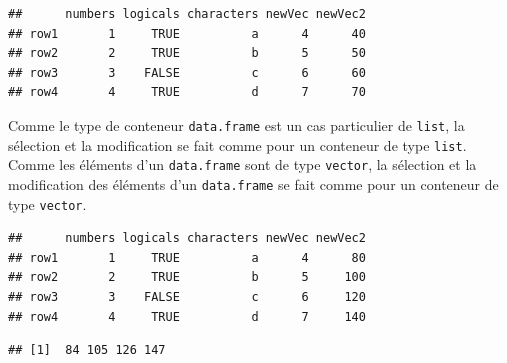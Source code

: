 \documentclass[
]{book}
\newenvironment{Shaded}{\begin{snugshade}}{\end{snugshade}}
\newcommand{\DecValTok}[1]{\textcolor[rgb]{0.00,0.00,0.81}{#1}}
\newcommand{\KeywordTok}[1]{\textcolor[rgb]{0.13,0.29,0.53}{\textbf{#1}}}
\newcommand{\NormalTok}[1]{#1}
\newcommand{\OperatorTok}[1]{\textcolor[rgb]{0.81,0.36,0.00}{\textbf{#1}}}
\newcommand{\StringTok}[1]{\textcolor[rgb]{0.31,0.60,0.02}{#1}}
\begin{document}
\begin{verbatim}
##      numbers logicals characters newVec newVec2
## row1       1     TRUE          a      4      40
## row2       2     TRUE          b      5      50
## row3       3    FALSE          c      6      60
## row4       4     TRUE          d      7      70
\end{verbatim}

Comme le type de conteneur \texttt{data.frame} est un cas particulier de \texttt{list}, la sélection et la modification se fait comme pour un conteneur de type \texttt{list}. Comme les éléments d'un \texttt{data.frame} sont de type \texttt{vector}, la sélection et la modification des éléments d'un \texttt{data.frame} se fait comme pour un conteneur de type \texttt{vector}.

\begin{Shaded}
\end{Shaded}

\begin{verbatim}
##      numbers logicals characters newVec newVec2
## row1       1     TRUE          a      4      80
## row2       2     TRUE          b      5     100
## row3       3    FALSE          c      6     120
## row4       4     TRUE          d      7     140
\end{verbatim}

\begin{Shaded}
\end{Shaded}

\begin{verbatim}
## [1]  84 105 126 147
\end{verbatim}

\begin{Shaded}
\end{Shaded}
\end{document}
